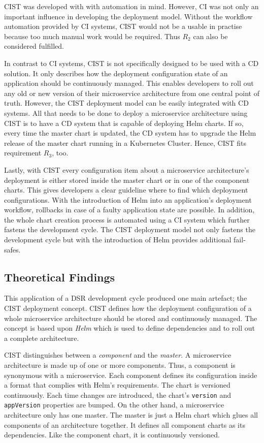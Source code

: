 \ac{CIST} was developed with with automation in mind. However, \ac{CI} was not
only an important influence in developing the deployment model. Without the
workflow automation provided by \ac{CI} systems, \ac{CIST} would not be a
usable in practise because too much manual work would be required. Thus $R_2$
can also be considered fulfilled.

In contrast to \ac{CI} systems, \ac{CIST} is not specifically designed to be
used with a \ac{CD} solution. It only describes how the deployment
configuration state of an application should be continuously managed. This
enables developers to roll out any old or new version of their microservice
architecture from one central point of truth. However, the \ac{CIST} deployment
model can be easily integrated with \ac{CD} systems. All that needs to be done
to deploy a microservice architecture using \ac{CIST} is to have a \ac{CD}
system that is capable of deploying Helm charts. If so, every time the master
chart is updated, the \ac{CD} system has to upgrade the Helm release of the
master chart running in a Kubernetes Cluster. Hence, \ac{CIST} fits requirement
$R_3$, too.

Lastly, with \ac{CIST} every configuration item about a microservice
architecture's deployment is either stored inside the master chart or in one of
the component charts. This gives developers a clear guideline where to find
which deployment configurations. With the introduction of Helm into an
application's deployment workflow, rollbacks in case of a faulty application
state are possible. In addition, the whole chart creation process is automated
using a \ac{CI} system which further fastens the development cycle. The
\ac{CIST} deployment model not only fastens the development cycle but with the
introduction of Helm provides additional fail-safes.

\subsection{Theoretical Findings}%
\label{sub:Theoretical_Findings}

This application of a \ac{DSR} development cycle produced one main artefact;
the \ac{CIST} deployment concept. \ac{CIST} defines how the deployment
configuration of a whole microservice architecture should be stored and
continuously managed. The concept is based upon \textit{Helm} which is used to
define dependencies and to roll out a complete architecture.

\ac{CIST} distinguishes between a \textit{component} and the \textit{master}. A
microservice architecture is made up of one or more components. Thus, a
component is synonymous with a microservice. Each component defines its
configuration inside a format that complies with Helm's requirements. The chart
is versioned continuously. Each time changes are introduced, the chart's
\texttt{version} and \texttt{appVersion} properties are bumped. On the other
hand, a microservice architecture only has one master. The master is just a
Helm chart which glues all components of an architecture together. It defines
all component charts as its dependencies. Like the component chart, it is
continuously versioned.

